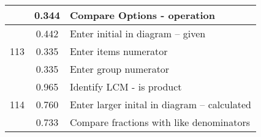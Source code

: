\begin{longtable}[c]{|c|c|l|}
 & \small 0.344 & \small Compare Options - operation \\
\hline
\multirow{3}{*}{\small 113} & \small 0.442 & \small Enter initial in diagram -- given \\
 & \small 0.335 & \small Enter items numerator \\
 & \small 0.335 & \small Enter group numerator \\
\hline
\multirow{3}{*}{\small 114} & \small 0.965 & \small Identify LCM - is product \\
 & \small 0.760 & \small Enter larger inital in diagram -- calculated \\
 & \small 0.733 & \small Compare fractions with like denominators \\
\hline
\end{longtable}


%
%


